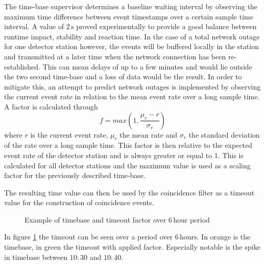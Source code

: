 \documentclass[abstract,toc,los,lof,english,10pt,glossary,acronyms]{jluthesis}
\begin{document}
The time-base supervisor determines a baseline waiting interval by observing the maximum time difference between event timestamps over a certain sample time interval. A value of $2\,\text{s}$ proved experimentally to provide a good balance between runtime impact, stability and reaction time. In the case of a total network outage for one detector station however, the events will be buffered locally in the station and transmitted at a later time when the network connection has been re-established. This can mean delays of up to a few minutes and would lie outside the two second time-base and a loss of data would be the result. In order to mitigate this, an attempt to predict network outages is implemented by observing the current event rate in relation to the mean event rate over a long sample time. A factor is calculated through
\begin{equation*}
	f = max(1, \frac{\mu_{r} - r}{\sigma_{r}})
\end{equation*}
where $r$ is the current event rate, $\mu_{r}$ the mean rate and $\sigma_{r}$ the standard deviation of the rate over a long sample time. This factor is then relative to the expected event rate of the detector station and is always greater or equal to 1. This is calculated for all detector stations and the maximum value is used as a scaling factor for the previously described time-base.

The resulting time value can then be used by the coincidence filter as a timeout value for the construction of coincidence events.

\begin{figure}[ht!]
	\centering
	\caption{Example of timebase and timeout factor over $6\,\text{hour}$ period}
	\label{fig:timeout-example}
\end{figure}
In figure \ref{fig:timeout-example} the timeout can be seen over a period over $6\,\text{hours}$. In orange is the timebase, in green the timeout with applied factor. Especially notable is the spike in timebase between $10:30$ and $10:40$.
\clearpage
\end{document}
